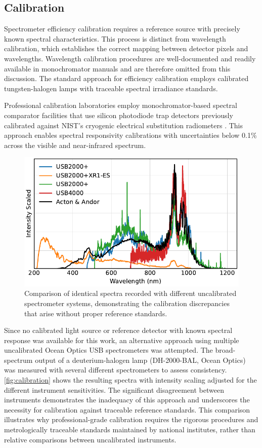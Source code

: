 \documentclass[
	parskip=half,
	a4paper,
]{scrarticle}
\begin{document}
\subsection{Calibration}
Spectrometer efficiency calibration requires a reference source with precisely known spectral characteristics. This process is distinct from wavelength calibration, which establishes the correct mapping between detector pixels and wavelengths. Wavelength calibration procedures are well-documented and readily available in monochromator manuals and are therefore omitted from this discussion. The standard approach for efficiency calibration employs calibrated tungsten-halogen lamps with traceable spectral irradiance standards.

Professional calibration laboratories employ monochromator-based spectral comparator facilities that use silicon photodiode trap detectors previously calibrated against NIST's cryogenic electrical substitution radiometers \cite{houston_achievement_2022,larason_nist_1996}. This approach enables spectral responsivity calibrations with uncertainties below 0.1\% across the visible and near-infrared spectrum.

\begin{figure}[hb]
    \centering
    \includegraphics{../analysis/figures/efficiency_different.pdf}
    \caption{Comparison of identical spectra recorded with different uncalibrated spectrometer systems, demonstrating the calibration discrepancies that arise without proper reference standards.}
    \label{fig:calibration}
\end{figure}

Since no calibrated light source or reference detector with known spectral response was available for this work, an alternative approach using multiple uncalibrated Ocean Optics USB spectrometers was attempted. The broad-spectrum output of a deuterium-halogen lamp (DH-2000-BAL, Ocean Optics) was measured with several different spectrometers to assess consistency. \autoref{fig:calibration} shows the resulting spectra with intensity scaling adjusted for the different instrument sensitivities. The significant disagreement between instruments demonstrates the inadequacy of this approach and underscores the necessity for calibration against traceable reference standards. This comparison illustrates why professional-grade calibration requires the rigorous procedures and metrologically traceable standards maintained by national institutes, rather than relative comparisons between uncalibrated instruments.
\end{document}
